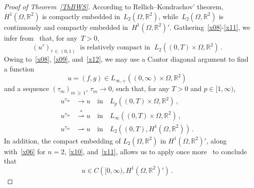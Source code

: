 \documentclass[AHL,Unicode,longabstracts,published]{cedram}
\newcommand{\bbR}{\mathbb{R}}
\begin{document}
\begin{proof}[Proof of Theorem~\ref{ThBWS}]
According to Rellich--Kondrachov' theorem, $H^1(\Omega,\bbR^2)$ is compactly embedded in~${L_2(\Omega,\bbR^2)}$, while~${L_2(\Omega,\bbR^2)}$ is continuously and compactly embedded in~$H^1(\Omega,\bbR^2)'$. Gathering~\eqref{x08}-\eqref{x11}, we infer from~\cite[Theorem~1]{DJ2012} that, for any~${T>0}$,
\begin{equation}\label{x12}
(u^\tau)_{\tau\,\in\,(0,1)} \;\text{ is relatively compact in }\; L_2\left((0,T)\times\Omega,\bbR^2\right)\,. 
\end{equation}
Owing to~\eqref{x08}, \eqref{x09}, and~\eqref{x12}, we may use a Cantor diagonal argument to find a function
\begin{equation*}
u=(f,g)\in L_{\infty,+}\left((0,\infty)\times\Omega,\bbR^2\right)
\end{equation*}
and a sequence $(\tau_m)_{m\,\ge\,1}$, $\tau_m\to 0$, such that, for any $T>0$ and $p\in [1,\infty)$,
\begin{equation}\label{x13}
\begin{split}
u^{\tau_m} & \rightarrow u \quad\text{in}\quad L_p\left((0,T)\times\Omega,\bbR^2\right)\,, \\
u^{\tau_m} & \stackrel{*}{\rightharpoonup} u \quad\text{in}\quad L_\infty\left((0,T)\times\Omega,\bbR^2\right)\,, \\
u^{\tau_m} & \rightharpoonup u \quad\text{in}\quad L_2\left((0,T),H^1\left(\Omega,\bbR^2\right)\right)\,.
\end{split}
\end{equation}
In addition, the compact embedding of $L_2(\Omega,\bbR^2)$ in $H^1(\Omega,\bbR^2)'$, along with~\eqref{x06} for $n=2$, \eqref{x10}, and~\eqref{x11}, allows us to apply once more~\cite[Theorem~1]{DJ2012} to conclude that
\begin{equation}\label{x14}
u\in C\left([0,\infty),H^1\left(\Omega,\bbR^2\right)'\right)\,. 
\end{equation}


\end{proof}
\end{document}
